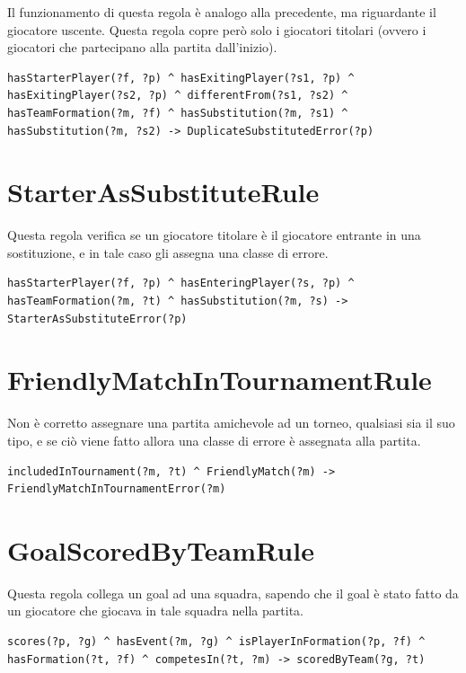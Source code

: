 \documentclass[11pt]{report} %
\begin{document}
\begin{itemize}[leftmargin=*]
Il funzionamento di questa regola è analogo alla precedente, ma riguardante il giocatore uscente.
Questa regola copre però solo i giocatori titolari (ovvero i giocatori che partecipano alla partita dall'inizio).

\begin{lstlisting}[language=SWRL]
hasStarterPlayer(?f, ?p) ^ hasExitingPlayer(?s1, ?p) ^ hasExitingPlayer(?s2, ?p) ^ differentFrom(?s1, ?s2) ^ hasTeamFormation(?m, ?f) ^ hasSubstitution(?m, ?s1) ^ hasSubstitution(?m, ?s2) -> DuplicateSubstitutedError(?p)
\end{lstlisting}

\section{StarterAsSubstituteRule}

Questa regola verifica se un giocatore titolare è il giocatore entrante in una sostituzione, e in tale caso gli assegna una classe di errore.

\begin{lstlisting}[language=SWRL]
hasStarterPlayer(?f, ?p) ^ hasEnteringPlayer(?s, ?p) ^ hasTeamFormation(?m, ?t) ^ hasSubstitution(?m, ?s) -> StarterAsSubstituteError(?p)
\end{lstlisting}

\section{FriendlyMatchInTournamentRule}

Non è corretto assegnare una partita amichevole ad un torneo, qualsiasi sia il suo tipo, e se ciò viene fatto allora una classe di errore è assegnata alla partita. 

\begin{lstlisting}[language=SWRL]
includedInTournament(?m, ?t) ^ FriendlyMatch(?m) -> FriendlyMatchInTournamentError(?m)
\end{lstlisting}

\section{GoalScoredByTeamRule}

Questa regola collega un goal ad una squadra, sapendo che il goal è stato fatto da un giocatore che giocava in tale squadra nella partita.

\begin{lstlisting}[language=SWRL]
scores(?p, ?g) ^ hasEvent(?m, ?g) ^ isPlayerInFormation(?p, ?f) ^ hasFormation(?t, ?f) ^ competesIn(?t, ?m) -> scoredByTeam(?g, ?t)
\end{lstlisting}


\end{itemize}
\end{document}
